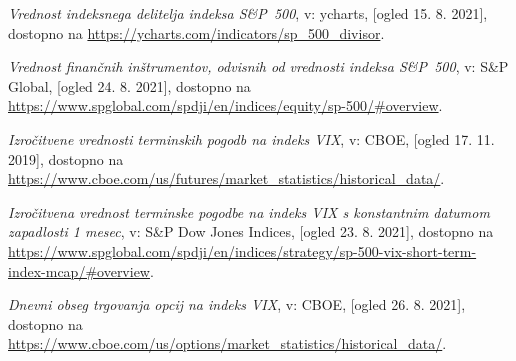 \documentclass[12pt,a4paper, reqno]{amsart}
\theoremstyle{definition} %
\theoremstyle{plain} %
\begin{document}
\begin{thebibliography}{99}
\emph{Vrednost indeksnega delitelja indeksa S\&P~500}, v: ycharts, [ogled 15. 8. 2021], dostopno na \url{https://ycharts.com/indicators/sp_500_divisor}.

\emph{Vrednost finančnih inštrumentov, odvisnih od vrednosti indeksa S\&P~500}, v: S\&P Global, [ogled 24. 8. 2021], dostopno na \url{https://www.spglobal.com/spdji/en/indices/equity/sp-500/#overview}.

\bibitem{}
\emph{Izročitvene vrednosti terminskih pogodb na indeks VIX}, v: CBOE, [ogled 17. 11. 2019], dostopno na \url{https://www.cboe.com/us/futures/market_statistics/historical_data/}.

\bibitem{}
\emph{Izročitvena vrednost terminske pogodbe na indeks VIX s konstantnim datumom zapadlosti 1 mesec}, v: S\&P Dow Jones Indices, [ogled 23. 8. 2021], dostopno na \url{https://www.spglobal.com/spdji/en/indices/strategy/sp-500-vix-short-term-index-mcap/#overview}.

\bibitem{}
\emph{Dnevni obseg trgovanja opcij na indeks VIX}, v: CBOE, [ogled 26. 8. 2021], dostopno na \url{https://www.cboe.com/us/options/market_statistics/historical_data/}.











\end{thebibliography}
\end{document}
